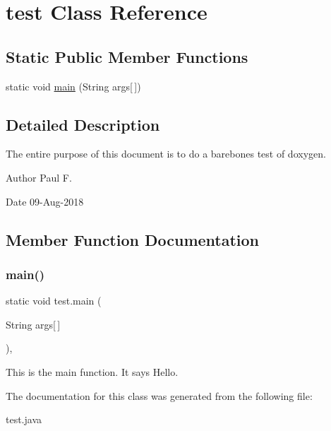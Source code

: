 \hypertarget{classtest}{}\section{test Class Reference}
\label{classtest}
\subsection*{Static Public Member Functions}
\begin{DoxyCompactItemize}
\item 
static void \mbox{\hyperlink{classtest_a75c8cd7b6ecf591bec8627109adcbc9d}{main}} (String args\mbox{[}$\,$\mbox{]})
\end{DoxyCompactItemize}


\subsection{Detailed Description}
The entire purpose of this document is to do a barebones test of doxygen.

\begin{DoxyAuthor}{Author}
Paul F. 
\end{DoxyAuthor}
\begin{DoxyDate}{Date}
09-\/\+Aug-\/2018 
\end{DoxyDate}


\subsection{Member Function Documentation}
\mbox{\label{classtest_a75c8cd7b6ecf591bec8627109adcbc9d}} 
\subsubsection{\texorpdfstring{main()}{main()}}
{\footnotesize\ttfamily static void test.\+main (\begin{DoxyParamCaption}\item[{String}]{args\mbox{[}$\,$\mbox{]} }\end{DoxyParamCaption})\hspace{0.3cm}{\ttfamily [inline]}, {\ttfamily [static]}}

This is the main function. It says Hello. 

The documentation for this class was generated from the following file\+:\begin{DoxyCompactItemize}
\item 
test.\+java\end{DoxyCompactItemize}
